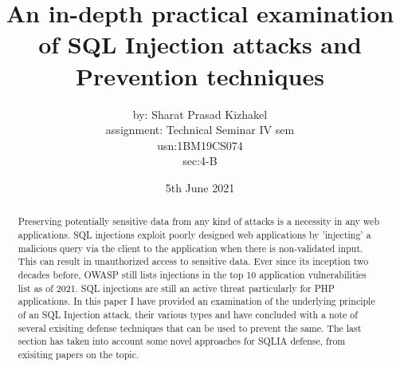 \documentclass[12pt]{article}
\title{An in-depth practical examination of SQL Injection attacks and Prevention techniques}
\author{by: Sharat Prasad Kizhakel\\assignment: Technical Seminar IV sem\\usn:1BM19CS074\\sec:4-B}
\date{5th June 2021}
\begin{document}
\maketitle
\newpage
\begin{abstract}
\begin{flushleft}
Preserving potentially sensitive data from any kind of attacks is a necessity in any web applications. SQL injections exploit poorly designed web applications by 'injecting' a malicious query via the client to the application when there is non-validated input. This can result in unauthorized access to sensitive data. Ever since its inception two decades before, OWASP still lists injections in the top 10 application vulnerabilities list as of 2021. SQL injections are still an active threat particularly for PHP applications. In this paper I have provided an examination of the underlying principle of an SQL Injection attack, their various types and have concluded with a note of several exisiting defense techniques that can be used to prevent the same. The last section has taken into account some novel approaches for SQLIA defense, from exisiting papers on the topic.  
\end{flushleft}
\end{abstract}
\clearpage
\tableofcontents
\clearpage
\end{document}

